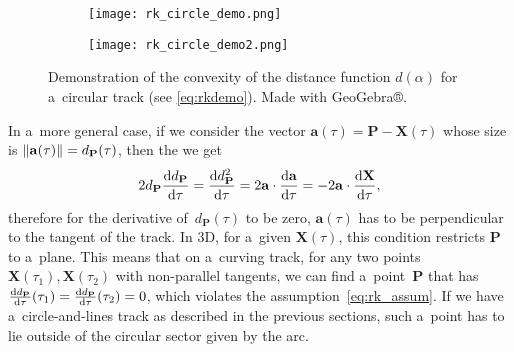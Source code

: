 		\begin{figure}
			\centering
			\begin{subfigure}[t]{0.7\textwidth}
				\centering
				\texttt{[image: rk\_circle\_demo.png]}
			\end{subfigure}
			\hfill
			\begin{subfigure}[t]{0.29\textwidth}
				\centering
				\texttt{[image: rk\_circle\_demo2.png]}
			\end{subfigure}
			\caption{Demonstration of the convexity of the distance function $d(\alpha)$ for a~circular track (see \cref{eq:rkdemo}). Made with GeoGebra®.}
			\label{fig:rkdemo}
		\end{figure}
		
		In a~more general case, if we consider the vector $\mathbf{a}(\tau) = \mathbf{P}-\mathbf{X}(\tau)$ whose size is $\norm{\mathbf{a}(\tau)} = d_\mathbf{P}(\tau)$, then the we get
			\begin{equation}
				2d_{\mathbf{P}}\dv{d_{\mathbf{P}}}{\tau}= \dv{d^2_{\mathbf{P}}}{\tau} = 2\mathbf{a}\cdot\dv{\mathbf{a}}{\tau} = -2\mathbf{a}\cdot\dv{\mathbf{X}}{\tau},
			\end{equation}
		therefore for the derivative of~$d_\mathbf{P}(\tau)$ to be zero, $\mathbf{a}(\tau)$ has to be perpendicular to the tangent of the track. In 3D, for a~given $\mathbf{X}(\tau)$, this condition restricts $\mathbf{P}$ to a~plane. This means that on a~curving track, for any two points $\mathbf{X}(\tau_1),\mathbf{X}(\tau_2)$ with non-parallel tangents, we can find a~point~$\mathbf{P}$ that has $\dv{d_{\mathbf{P}}}{\tau}{(\tau_1)} = \dv{d_{\mathbf{P}}}{\tau}{(\tau_2)} = 0$, which violates the assumption~\ref{eq:rk_assum}. If we have a~circle-and-lines track as described in the previous sections, such a~point has to lie outside of the circular sector given by the arc.
		
